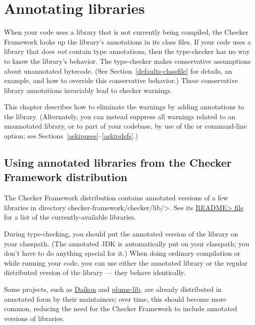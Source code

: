 \htmlhr
\chapter{Annotating libraries\label{annotating-libraries}}

When your code uses a library that is not currently being compiled,
the Checker Framework looks up the library's annotations in its class files.
If your code uses a library that does \emph{not} contain type annotations,
then the type-checker has no way to know the library's behavior.
The type-checker
makes conservative assumptions about unannotated bytecode.
(See
Section~\ref{defaults-classfile} for details, an example, and how to
override this conservative behavior.)
These conservative library
annotations invariably lead to checker warnings.

This chapter describes how to eliminate
the warnings by adding annotations to the library.
(Alternately, you can instead
suppress all warnings related to an unannotated library, or to part of your
codebase, by use of the
 or  command-line option; see
Sections~\ref{askipuses}--\ref{askipdefs}.)


\section{Using annotated libraries from the Checker Framework distribution\label{annotated-libraries-using}}

The Checker Framework distribution contains annotated versions of a few
libraries in directory \<checker-framework/checker/lib/>.  See its
\href{https://github.com/typetools/checker-framework/tree/master/checker/lib}{\<README>
  file} for a list of the currently-available libraries.

During type-checking, you should put the annotated version of the library on
your classpath.  (The annotated JDK is automatically put on your classpath;
you don't have to
do anything special for it.)
When doing ordinary compilation or while running your code,
you can use either the annotated
library or the regular distributed version of the library --- they
behave identically.

Some projects, such as
  \href{http://plse.cs.washington.edu/daikon/}{Daikon}
  and
  \href{https://mernst.github.io/plume-lib/}{plume-lib},
are already distributed in annotated form by their maintainers;
over time, this should become more common, reducing the need for the
Checker Framework to include annotated versions of libraries.


